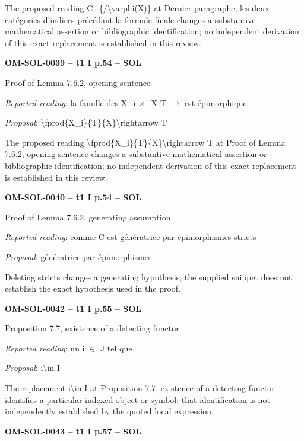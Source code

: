 The proposed reading C\_\{/\textbackslash{}varphi(X)\} at Dernier paragraphe, les deux catégories d'indices précédant la formule finale changes a substantive mathematical assertion or bibliographic identification; no independent derivation of this exact replacement is established in this review.\par
\par\noindent\textbf{OM-SOL-0039 -- t1 I p.54 -- SOL}\par
Proof of Lemma 7.6.2, opening sentence\par
\emph{Reported reading}: la famille des X\_i \ensuremath{\times}\_X T \ensuremath{\to} est épimorphique\par
\emph{Proposal}: \textbackslash{}fprod\{X\_i\}\{T\}\{X\}\textbackslash{}rightarrow T\par
The proposed reading \textbackslash{}fprod\{X\_i\}\{T\}\{X\}\textbackslash{}rightarrow T at Proof of Lemma 7.6.2, opening sentence changes a substantive mathematical assertion or bibliographic identification; no independent derivation of this exact replacement is established in this review.\par
\par\noindent\textbf{OM-SOL-0040 -- t1 I p.54 -- SOL}\par
Proof of Lemma 7.6.2, generating assumption\par
\emph{Reported reading}: comme C est génératrice par épimorphismes stricts\par
\emph{Proposal}: génératrice par épimorphismes\par
Deleting stricts changes a generating hypothesis; the supplied snippet does not establish the exact hypothesis used in the proof.\par
\par\noindent\textbf{OM-SOL-0042 -- t1 I p.55 -- SOL}\par
Proposition 7.7, existence of a detecting functor\par
\emph{Reported reading}: un i \ensuremath{\in} J tel que\par
\emph{Proposal}: i\textbackslash{}in I\par
The replacement i\textbackslash{}in I at Proposition 7.7, existence of a detecting functor identifies a particular indexed object or symbol; that identification is not independently established by the quoted local expression.\par
\par\noindent\textbf{OM-SOL-0043 -- t1 I p.57 -- SOL}\par
